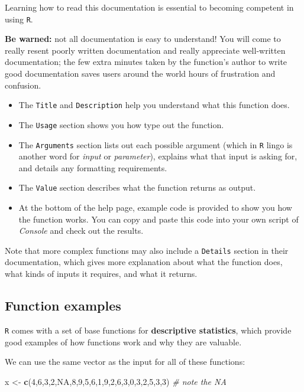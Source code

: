 \documentclass[
]{book}
\newenvironment{Shaded}{\begin{snugshade}}{\end{snugshade}}
\newcommand{\CommentTok}[1]{\textcolor[rgb]{0.56,0.35,0.01}{\textit{#1}}}
\newcommand{\DecValTok}[1]{\textcolor[rgb]{0.00,0.00,0.81}{#1}}
\newcommand{\KeywordTok}[1]{\textcolor[rgb]{0.13,0.29,0.53}{\textbf{#1}}}
\newcommand{\NormalTok}[1]{#1}
\newcommand{\OtherTok}[1]{\textcolor[rgb]{0.56,0.35,0.01}{#1}}
\newcommand{\StringTok}[1]{\textcolor[rgb]{0.31,0.60,0.02}{#1}}
\begin{document}
Learning how to read this documentation is essential to becoming competent in using \texttt{R}.

\textbf{Be warned:} not all documentation is easy to understand! You will come to really resent poorly written documentation and really appreciate well-written documentation; the few extra minutes taken by the function's author to write good documentation saves users around the world hours of frustration and confusion.

\begin{itemize}
\item
  The \texttt{Title} and \texttt{Description} help you understand what this function does.
\item
  The \texttt{Usage} section shows you how type out the function.
\item
  The \texttt{Arguments} section lists out each possible argument (which in \texttt{R} lingo is another word for \emph{input} or \emph{parameter}), explains what that input is asking for, and details any formatting requirements.
\item
  The \texttt{Value} section describes what the function returns as output.
\item
  At the bottom of the help page, example code is provided to show you how the function works. You can copy and paste this code into your own script of \emph{Console} and check out the results.
\end{itemize}

Note that more complex functions may also include a \texttt{Details} section in their documentation, which gives more explanation about what the function does, what kinds of inputs it requires, and what it returns.

\hypertarget{function-examples}{%
\subsection*{Function examples}\label{function-examples}}

\texttt{R} comes with a set of base functions for \textbf{descriptive statistics}, which provide good examples of how functions work and why they are valuable.

We can use the same vector as the input for all of these functions:

\begin{Shaded}
\begin{Highlighting}[]
\NormalTok{x <-}\StringTok{ }\KeywordTok{c}\NormalTok{(}\DecValTok{4}\NormalTok{,}\DecValTok{6}\NormalTok{,}\DecValTok{3}\NormalTok{,}\DecValTok{2}\NormalTok{,}\OtherTok{NA}\NormalTok{,}\DecValTok{8}\NormalTok{,}\DecValTok{9}\NormalTok{,}\DecValTok{5}\NormalTok{,}\DecValTok{6}\NormalTok{,}\DecValTok{1}\NormalTok{,}\DecValTok{9}\NormalTok{,}\DecValTok{2}\NormalTok{,}\DecValTok{6}\NormalTok{,}\DecValTok{3}\NormalTok{,}\DecValTok{0}\NormalTok{,}\DecValTok{3}\NormalTok{,}\DecValTok{2}\NormalTok{,}\DecValTok{5}\NormalTok{,}\DecValTok{3}\NormalTok{,}\DecValTok{3}\NormalTok{)  }\CommentTok{# note the NA}
\end{Highlighting}
\end{Shaded}
\end{document}
